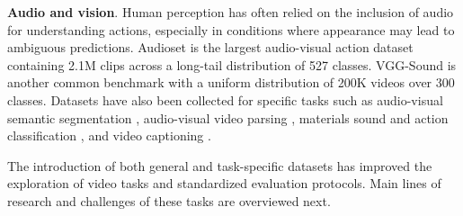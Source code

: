 \noindent
\textbf{Audio and vision}. Human perception has often relied on the inclusion of audio for understanding actions, especially in conditions where appearance may lead to ambiguous predictions. Audioset \citep{gemmeke2017audio} is the largest audio-visual action dataset containing 2.1M clips across a long-tail distribution of 527 classes. VGG-Sound \citep{chen2020vggsound} is another common benchmark with a uniform distribution of 200K videos over 300 classes. Datasets have also been collected for specific tasks such as audio-visual semantic segmentation \citep{zhou2022audio}, audio-visual video parsing \citep{tian2020unified}, materials sound and action classification \citep{huh2023epic,owens2016visually}, and video captioning \citep{monfort2021spoken}.





The introduction of both general and task-specific datasets has improved the exploration of video tasks and standardized evaluation protocols. Main lines of research and challenges of these tasks are overviewed next.